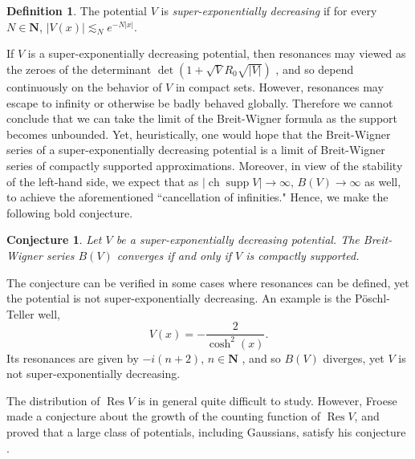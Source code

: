 \documentclass[reqno,12pt,letterpaper]{amsart}
\newcommand{\NN}{\mathbf{N}}
\DeclareMathOperator{\ch}{ch}
\DeclareMathOperator{\Res}{Res}
\DeclareMathOperator{\supp}{supp}
\newcommand{\dfn}[1]{\emph{#1}\index{#1}}
\newtheorem{conjecture}[theorem]{Conjecture}
\theoremstyle{definition}
\newtheorem{definition}[theorem]{Definition}
\begin{document}
\begin{definition}
The potential $V$ is \dfn{super-exponentially decreasing} if for every $N \in \NN$, $|V(x)| \lesssim_N e^{-N|x|}$.
\end{definition}

If $V$ is a super-exponentially decreasing potential, then resonances may viewed as the zeroes of the determinant $\det(1+\sqrt V R_0\sqrt{|V|})$ \cite[\S3]{froese1997asymptotic}, and so depend continuously on the behavior of $V$ in compact sets. However, resonances may escape to infinity or otherwise be badly behaved globally. Therefore we cannot conclude that we can take the limit of the Breit-Wigner formula as the support becomes unbounded.
Yet, heuristically, one would hope that the Breit-Wigner series of a super-exponentially decreasing potential is a limit of Breit-Wigner series of compactly supported approximations. Moreover, in view of the stability of the left-hand side, we expect that as $|\ch \supp V| \to \infty$, $B(V) \to \infty$ as well, to achieve the aforementioned ``cancellation of infinities." Hence, we make the following bold conjecture.
\begin{conjecture}
\label{strong conjecture}
Let $V$ be a super-exponentially decreasing potential. The Breit-Wigner series $B(V)$ converges if and only if $V$ is compactly supported.
\end{conjecture}
The conjecture can be verified in some cases where resonances can be defined, yet the potential is not super-exponentially decreasing.
An example is the P\"oschl-Teller well,
$$V(x) = -\frac{2}{\cosh^2(x)}.$$
Its resonances are given by $-i(n+2)$, $n \in \NN$ \cite{cevik_2016}, and so $B(V)$ diverges, yet $V$ is not super-exponentially decreasing.

The distribution of $\Res V$ is in general quite difficult to study.
However, Froese made a conjecture \cite[Conjecture 1.2]{froese1997asymptotic} about the growth of the counting function of $\Res V$, and proved that a large class of potentials, including Gaussians, satisfy his conjecture \cite[Theorem 1.3]{froese1997asymptotic}.
\end{document}
